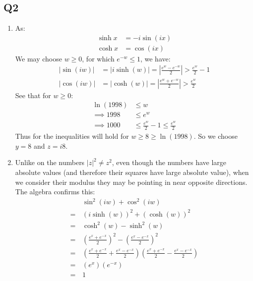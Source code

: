 \documentclass[a4paper, 11pt]{article}
\begin{document}
\begin{multicols}{2}
	\section*{Q2}
	\begin{enumerate}[label=(\alph*)]
		\item
		      As:
		      \begin{align*}
			      \sinh x & =-i\sin(ix) \\
			      \cosh x & = \cos(ix)
		      \end{align*}
		      We may choose $w\geq 0$, for which $e^{-w}\leq 1$, we have:
		      \begin{align*}
			      |\sin(iw)| & = |i\sinh(w) | = \left| \frac{e^w-e^{-w}}{2}\right| > \frac{e^w}2 -1 \\
			      |\cos(iw)| & = | \cosh(w) | = \left| \frac{e^w+e^{-w}}{2}\right| > \frac{e^w}2
		      \end{align*}
		      See that for $w\geq 0$:
		      \begin{align*}
			      \ln(1998)      & \leq w                               \\
			      \implies 1998  & \leq e^{w}                           \\
			      \implies  1000 & \leq \frac{e^w}2 -1 \leq \frac{e^w}2
		      \end{align*}
		      Thus for the inequalities will hold for $w\geq 8 \geq \ln(1998)$. So we choose $y=8$ and $z=i8$.
		\item
		      Unlike on the numbers $|z|^2 \neq z^2$, even though the numbers have large absolute values (and therefore their squares have large absolute value), when we consider their modulus they may be pointing in near opposite directions. The algebra confirms this:
		      \begin{align*}
			              & \sin^2(iw) + \cos^2(iw)                                                                                              \\
			      = \,    & (i\sinh(w))^2 + (\cosh(w))^2                                                                                         \\
			      =\,     & \cosh^2(w)-\sinh^2(w)                                                                                                \\
			      =\,     & \left(\frac{e^{x}+e^{-x}}{2}\right)^{2}-\left(\frac{e^{x}-e^{-x}}{2}\right)^{2}                                      \\
			      =\,     & \left(\frac{e^{x}+e^{-x}}{2}+\frac{e^{x}-e^{-x}}{2}\right)\left(\frac{e^{x}+e^{-x}}{2}-\frac{e^{x}-e^{-x}}{2}\right) \\
			      =\,     & \left( e^x \right) \left( e^{-x} \right)                                                                             \\
			      =    \, & 1
		      \end{align*}



\end{enumerate}
\end{multicols}
\end{document}
